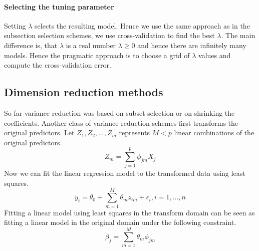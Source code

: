 \documentclass[../document.tex]{subfiles}
\begin{document}
	\paragraph{Selecting the tuning parameter}
	Setting \(\lambda\) selects the resulting model. Hence we use the same approach as in the subsection selection schemes, we use cross-validation to find the best \(\lambda\). The main difference is, that \(\lambda\) is a real number \(\lambda \geq0\) and hence there are infinitely many models. Hence the pragmatic approach is to choose a grid of \(\lambda\) values and compute the cross-validation error.

	\subsection{Dimension reduction methods}
	So far variance reduction was based on subset selection or on shrinking the coefficients. Another class of variance reduction schemes first transforms the original predictors. Let \(Z_{1},Z_{2},...,Z_{m}\) represents \(M<p\) linear combinations of the original predictors.
	\begin{equation}
		Z_{m}=\sum_{j=1}^{p}\phi_{jm}X_{j}
	\end{equation}
	Now we can fit the linear regression model to the transformed data using least squares.
	\begin{equation}
		y_{i}=\theta_{0}+\sum_{m=1}^{M}\theta_{m}z_{im}+\epsilon_{i}, i=1,...,n
	\end{equation}
	Fitting a linear model using least squares in the transform domain can be seen as fitting a linear model in the original domain under the following constraint.
	\begin{equation}
		\beta_{j}=\sum_{m=1}^{M}\theta_{m}\phi_{jm}
	\end{equation}
\end{document}
